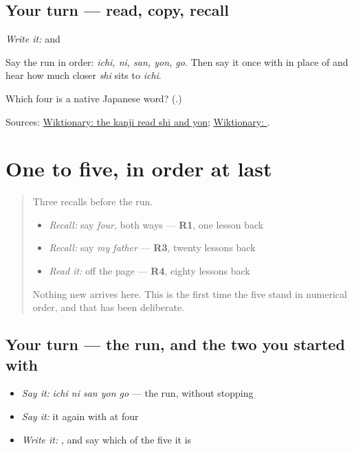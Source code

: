 \subsection*{Your turn — read, copy, recall}
\emph{Write it:} \textbf{} and \textbf{}

Say the run in order: \emph{ichi, ni, san, yon, go}. Then say it once with \textbf{} in place of \textbf{} and hear how much closer \emph{shi} sits to \emph{ichi}.

\begin{tcolorbox}[breakable,colback=teal!4,colframe=teal!35!black,title={Before you move on}]
Which four is a native Japanese word? (\textbf{}.)

Sources: \href{https://en.wiktionary.org/wiki/\%E5\%9B\%9B}{Wiktionary: the kanji read shi and yon}; \href{https://en.wiktionary.org/wiki/\%E3\%82\%88\%E3\%82\%93}{Wiktionary: }.
\end{tcolorbox}
\section[Practice]{One to five, in order at last}

\label{lesson:JA-R14-one-to-five}



\begin{quote}
Three recalls before the run.

\begin{itemize}
\raggedright
  \item \emph{Recall:} say \emph{four}, both ways — \textbf{R1}, one lesson back
  \item \emph{Recall:} say \emph{my father} — \textbf{R3}, twenty lessons back
  \item \emph{Read it:} \textbf{} off the page — \textbf{R4}, eighty lessons back
\end{itemize}

Nothing new arrives here. This is the first time the five stand in numerical order, and that has been deliberate.
\end{quote}

\subsection*{Your turn — the run, and the two you started with}
\begin{itemize}
\raggedright
  \item \emph{Say it:} \emph{ichi ni san yon go} — the run, without stopping
  \item \emph{Say it:} it again with \textbf{} at four
  \item \emph{Write it:} \textbf{}, and say which of the five it is
\end{itemize}

